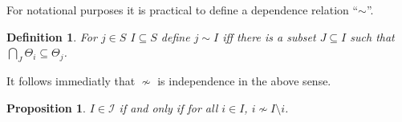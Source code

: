 \documentclass[a4paper,12pt]{article}
\newtheorem{comment}{Comment}
\newtheorem{definition}{Definition}
\newtheorem{proposition}{Proposition}
\newcommand{\ie}{{\em i.e.,}~}
\begin{document}
For notational purposes it is practical to define a dependence
relation ``$\sim$''.

\begin{definition}
  For $j \in S$ $I \subseteq S$ define $j \sim I$ iff there is a subset
  $J \subseteq I$ such that $\bigcap_J \Theta_i \subseteq \Theta_j$.
\end{definition}

It follows immediatly that $\nsim$ is independence in the above sense.

\begin{proposition}
  $I \in \mathscr{I}$ if and only if for all $i \in I$, $i \nsim
  I\setminus i$.
\end{proposition}

\begin{comment}
  Some interesting notes on above matroid.
  \begin{itemize}
  \item We have $\emptyset \sim i$ for all $i \in S$, but $i \nsim
    \emptyset$ unless $\Theta_i = \Theta$. Essentially this means that
    there are no loops in $M(\mathcal{H})$
  \item For hypotheses $H_i,H_j$ such that $\Theta_j \subset \Theta_i$
    we have $i \sim j$ and this for example is the case for combined
    non-inferiority superiority testing.
  \item The rank function of an index set $I$ is given by the
    cardinality of its maximally independent subsets, \ie $\rho I =
    \max \{|J|:J\subseteq I, J \in \mathscr{I}\}$.
  \item To give some intuition to condition \ref{cond:matroida} one
    may see that for the simple case of $J = \{i\}$ and $I = \{j,l\}$
    the condition requires that for parallels $i \sim j$ we have $i
    \nsim l$ as $i \sim l$ would imply also $j \sim l$ which is in
    contradiction to the independence of $I$. For $|J|>1$ the
    condition does not necesarily involve parallels.
  \item As a system of null hypotheses that does not conform to
    \ref{cond:matroida} consider the following set of hypotheses:
    \begin{align*}
      H_1:& (\mu_1 \leq 0) &, (\mu_2 \leq 0) \\
      H_2:& \mu_1 &\leq 0 \\
      H_3:& \mu_2 &\leq 0,
    \end{align*}
    according to Definition \ref{def:indep} $\{1\},\{2,3\} \in
    \mathscr{I}$, however $\Theta_1 = \Theta_2 \cap \Theta_3$. From a

\end{comment}
\end{document}
